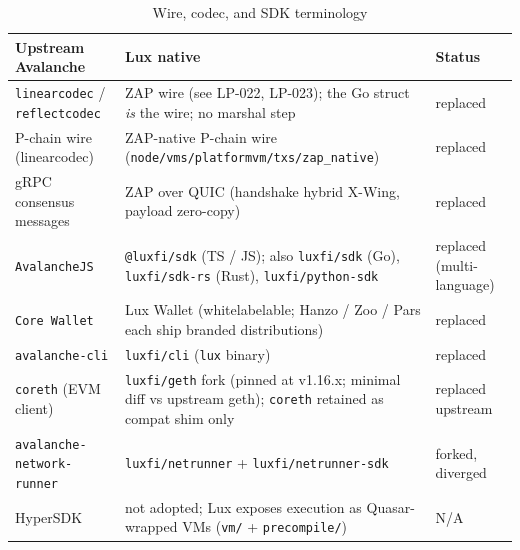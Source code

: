 \begin{table}[h]
\centering
\small
\caption{Wire, codec, and SDK terminology}
\label{tab:trans-wire}
\begin{tabular}{p{4.3cm} p{6.5cm} p{2.5cm}}
\toprule
\textbf{Upstream Avalanche} & \textbf{Lux native} & \textbf{Status} \\
\midrule
\texttt{linearcodec} / \texttt{reflectcodec}
  & ZAP wire (see LP-022, LP-023); the Go struct \textit{is} the
    wire; no marshal step
  & replaced \\
P-chain wire (linearcodec)
  & ZAP-native P-chain wire (\texttt{node/vms/platformvm/txs/zap\_native})
  & replaced \\
gRPC consensus messages
  & ZAP over QUIC (handshake hybrid X-Wing, payload zero-copy)
  & replaced \\
\texttt{AvalancheJS}
  & \texttt{@luxfi/sdk} (TS / JS); also \texttt{luxfi/sdk} (Go),
    \texttt{luxfi/sdk-rs} (Rust), \texttt{luxfi/python-sdk}
  & replaced (multi-language) \\
\texttt{Core Wallet}
  & Lux Wallet (whitelabelable; Hanzo / Zoo / Pars
    each ship branded distributions)
  & replaced \\
\texttt{avalanche-cli}
  & \texttt{luxfi/cli} (\texttt{lux} binary)
  & replaced \\
\texttt{coreth} (EVM client)
  & \texttt{luxfi/geth} fork (pinned at v1.16.x; minimal diff vs
    upstream geth); \texttt{coreth} retained as compat shim only
  & replaced upstream \\
\texttt{avalanche-network-runner}
  & \texttt{luxfi/netrunner} + \texttt{luxfi/netrunner-sdk}
  & forked, diverged \\
HyperSDK
  & not adopted; Lux exposes execution as Quasar-wrapped VMs
    (\texttt{vm/} + \texttt{precompile/})
  & N/A \\
\bottomrule
\end{tabular}
\end{table}

